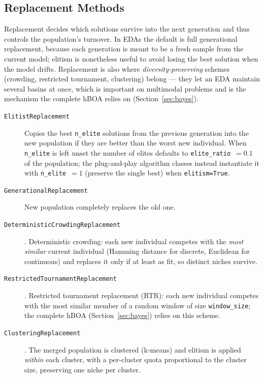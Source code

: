 \documentclass[a4paper,11pt]{article}
\begin{document}
\subsection{Replacement Methods}

Replacement decides which solutions survive into the next generation and thus
controls the population's turnover. In EDAs the default is full generational
replacement, because each generation is meant to be a fresh sample from the
current model; elitism is nonetheless useful to avoid losing the best solution
when the model drifts. Replacement is also where \emph{diversity-preserving}
schemes (crowding, restricted tournament, clustering) belong --- they let an EDA
maintain several basins at once, which is important on multimodal problems and
is the mechanism the complete hBOA relies on (Section~\ref{sec:bayes}).

\begin{description}
  \item[\texttt{ElitistReplacement}]
    Copies the best \texttt{n\_elite} solutions from the previous generation
    into the new population if they are better than the worst new individual.
    When \texttt{n\_elite} is left unset the number of elites defaults to
    \texttt{elite\_ratio}~$=0.1$ of the population; the plug-and-play algorithm
    classes instead instantiate it with \texttt{n\_elite}~$=1$ (preserve the
    single best) when \texttt{elitism=True}.

  \item[\texttt{GenerationalReplacement}]
    New population completely replaces the old one.

  \item[\texttt{DeterministicCrowdingReplacement}] \citep{Mahfoud:1995}.
    Deterministic crowding: each new individual competes with the \emph{most
    similar} current individual (Hamming distance for discrete, Euclidean for
    continuous) and replaces it only if at least as fit, so distinct niches
    survive.

  \item[\texttt{RestrictedTournamentReplacement}] \citep{Harik:1995}.
    Restricted tournament replacement (RTR): each new individual competes with
    the most similar member of a random window of size \texttt{window\_size};
    the complete hBOA (Section~\ref{sec:bayes}) relies on this scheme.

  \item[\texttt{ClusteringReplacement}].
    The merged population is clustered (k-means) and elitism is applied
    \emph{within} each cluster, with a per-cluster quota proportional to the
    cluster size, preserving one niche per cluster.
\end{description}
\end{document}
